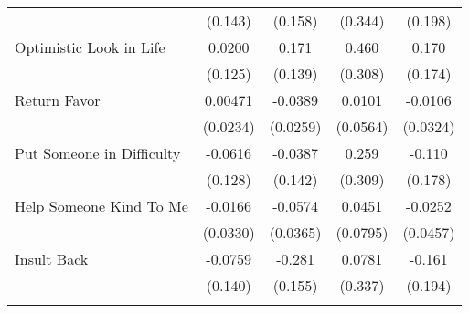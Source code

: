{\begin{tabular}{l*{4}{c}}
            &     (0.143)         &     (0.158)         &     (0.344)         &     (0.198)         \\
[1em]
Optimistic Look in Life&      0.0200         &       0.171         &       0.460         &       0.170         \\
            &     (0.125)         &     (0.139)         &     (0.308)         &     (0.174)         \\
[1em]
Return Favor&     0.00471         &     -0.0389         &      0.0101         &     -0.0106         \\
            &    (0.0234)         &    (0.0259)         &    (0.0564)         &    (0.0324)         \\
[1em]
Put Someone in Difficulty&     -0.0616         &     -0.0387         &       0.259         &      -0.110         \\
            &     (0.128)         &     (0.142)         &     (0.309)         &     (0.178)         \\
[1em]
Help Someone Kind To Me&     -0.0166         &     -0.0574         &      0.0451         &     -0.0252         \\
            &    (0.0330)         &    (0.0365)         &    (0.0795)         &    (0.0457)         \\
[1em]
Insult Back &     -0.0759         &      -0.281         &      0.0781         &      -0.161         \\
            &     (0.140)         &     (0.155)         &     (0.337)         &     (0.194)         \\
\hline\hline
{}\\
\end{tabular}
}

